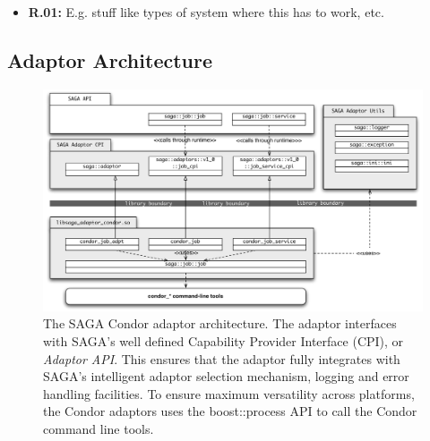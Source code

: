 \begin{itemize}
\item \textbf{R.01:} E.g. stuff like types of system where this has to work, etc.
\end{itemize}

\subsection{Adaptor Architecture}

\begin{figure}
  \includegraphics[width=1.0\textwidth]{./figures/condor_adaptor_arch}
  \caption{\footnotesize The SAGA Condor adaptor architecture. The adaptor interfaces
  with SAGA's well defined Capability Provider Interface (CPI), or \textit{Adaptor API}.
  This ensures that the adaptor fully integrates with SAGA's intelligent adaptor selection
  mechanism, logging and error handling facilities. To ensure maximum versatility across
  platforms, the Condor adaptors uses the boost::process API to call the Condor command 
  line tools. }
  
 \label{sagalayer}
\end{figure}




